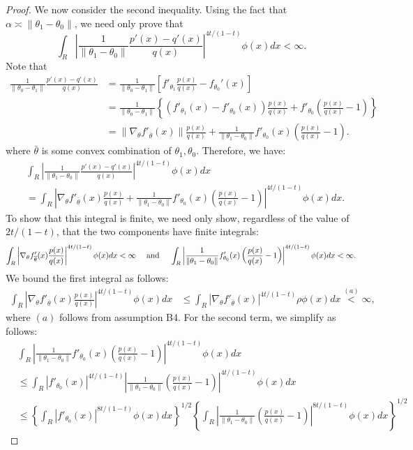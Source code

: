 \documentclass{article}
\begin{document}
\begin{proof}
We now consider the second inequality. Using the fact that $\alpha \asymp \| \theta_1 - \theta_0 \|$, we need only prove that
\[
\int_R \left| \frac{1}{\| \theta_1 - \theta_0\| } \frac{p'(x) - q'(x)}{q(x)} \right|^{4t/(1-t)} \phi(x) dx < \infty.
\]
Note that
\begin{align*}
\frac{1}{\| \theta_0 - \theta_1 \|} \frac{p'(x) - q'(x)}{q(x)}& = 
   \frac{1}{\| \theta_0 - \theta_1 \|} \left[
           f'_{\theta_1} \frac{p(x)}{q(x)} - f_{\theta_0}'(x) \right] \\
  &= \frac{1}{\|\theta_0 - \theta_1\|} \left\{ 
          ( f'_{\theta_1}(x) - f'_{\theta_0}(x) ) \frac{p(x)}{q(x)} 
       + f'_{\theta_0} \left( \frac{p(x)}{q(x)} - 1 \right) \right\} \\
  &= \| \nabla_{\theta} f'_{\bar{\theta}}(x) \| \frac{p(x)}{q(x)} 
         + \frac{1}{\| \theta_1 - \theta_0\|} f'_{\theta_0}(x) \left( \frac{p(x)}{q(x)} - 1 \right).
\end{align*}
where $\bar{\theta}$ is some convex combination of $\theta_1, \theta_0$. Therefore, we have:
\begin{align*}
& \int_R \left| \frac{1}{\| \theta_1 - \theta_0\| } \frac{p'(x) - q'(x)}{q(x)} \right|^{4t/(1-t)} \phi(x) dx \\
& =  \int_R \left|  \nabla_{\theta} f'_{\bar{\theta}}(x) \frac{p(x)}{q(x)} 
         + \frac{1}{\| \theta_1 - \theta_0\|} f'_{\theta_0}(x) \left( \frac{p(x)}{q(x)} - 1 \right)  \right|^{4t/(1-t)} \phi(x)dx.
\end{align*}
To show that this integral is finite, we need only show, regardless of the value of $2t/(1-t)$, that the two components have finite integrals:
\[
 \int_R \left|  \nabla_{\theta} f'_{\overline{\theta}}(x) \frac{p(x)}{q(x)} \right|^{4t/(1-t)} \phi(x) dx < \infty \quad \textrm{ and } \quad
         \int_R \left| \frac{1}{\| \theta_1 - \theta_0\|} f'_{\theta_0}(x) \left( \frac{p(x)}{q(x)} - 1 \right)  \right|^{4t/(1-t)} \phi(x)dx < \infty.
\]
We bound the first integral as follows:
\begin{align*}
 \int_R \left|  \nabla_{\theta} f'_{\bar{\theta}}(x) \frac{p(x)}{q(x)} \right|^{4t/(1-t)} \phi(x) dx &\leq 
            \int_R \left|  \nabla_{\theta} f'_{\bar{\theta}}(x) \right|^{4t/(1-t)} \rho \phi(x) dx  \stackrel{(a)}< \infty,
\end{align*}
where $(a)$ follows from assumption B4.  For the second term, we simplify as follows:
\begin{align*}
&  \int_R \left| \frac{1}{\| \theta_1 - \theta_0\|} f'_{\theta_0}(x) \left( \frac{p(x)}{q(x)} - 1 \right)  \right|^{4t/(1-t)} \phi(x)dx \\
    &\leq \int_R | f'_{\theta_0}(x) |^{4t/(1-t)}
             \left|  \frac{1}{\| \theta_1 - \theta_0\|}  \left( \frac{p(x)}{q(x)} - 1 \right)  \right|^{4t/(1-t)} \phi(x) dx \\
    &\leq \left\{ \int_R  | f'_{\theta_0}(x) |^{8t/(1-t)} \phi(x) dx \right\}^{1/2} 
         \left\{
            \int_R
             \left| \frac{1}{\| \theta_1 - \theta_0\|}  \left( \frac{p(x)}{q(x)} - 1 \right)  \right|^{8t/(1-t)} \phi(x) dx 
         \right\}^{1/2} 
\end{align*}


\end{proof}
\end{document}
